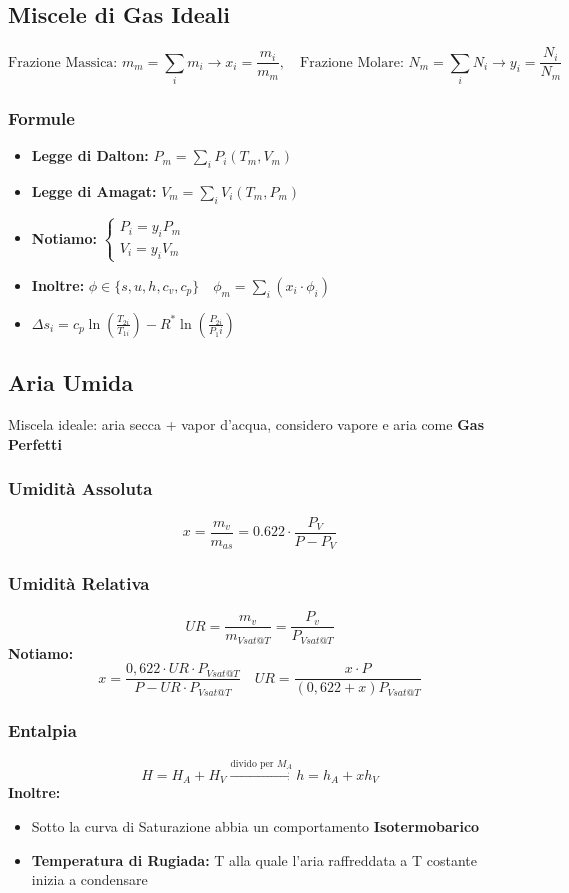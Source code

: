 \documentclass[a4paper]{report}
\begin{document}
\subsection*{Miscele di Gas Ideali}
\[
    \text{Frazione Massica: }\boxed{m_m = \sum_i m_i} \rightarrow \boxed{x_i = \frac{m_i}{m_m}}, \quad \text{Frazione Molare: }\boxed{N_m=\sum_i N_i}\rightarrow\boxed{y_i = \frac{N_i}{N_m}}
\]
\subsubsection*{Formule}
\begin{itemize}
    \item \textbf{Legge di Dalton:} $P_m = \sum_i P_i(T_m, V_m)$
    \item \textbf{Legge di Amagat:} $V_m = \sum_i V_i(T_m, P_m)$
    \item \textbf{Notiamo:} $\left\{\begin{array}{l}
    P_i = y_iP_m \\
    V_i = y_iV_m
    \end{array}\right.$
    \item \textbf{Inoltre:} $\phi \in \{s,u,h,c_v,c_p\} \quad \phi_m = \sum_i (x_i\cdot\phi_i )$
    \item $\boxed{\Delta s_i = c_p\ln\left(\frac{T_{2i}}{T_{1i}}\right)-R^*\ln\left(\frac{P_{2i}}{P_1i}\right)}$
\end{itemize}


\subsection*{Aria Umida}
Miscela ideale: aria secca + vapor d'acqua, considero vapore e aria come \textbf{Gas Perfetti}
\subsubsection*{Umidità Assoluta}
\[
   \boxed{x = \frac{m_v}{m_{as}} = 0.622 \cdot \frac{P_V}{P-P_V}}
\]
\subsubsection*{Umidità Relativa}
\[
   \boxed{UR = \frac{m_v}{m_{Vsat@T}} = \frac{P_v}{P_{Vsat@T}}}
\]
\textbf{Notiamo:}
\[
    \boxed{x = \frac{0,622 \cdot UR \cdot P_{Vsat@T}}{P-UR\cdot P_{Vsat@T}} } \quad \boxed{UR=\frac{x\cdot P}{(0,622+x)P_{Vsat@T}} }
\]
\subsubsection{Entalpia}
\[
    \boxed{H=H_A+H_V}\xrightarrow{\text{divido per } M_A}\boxed{h=h_A+xh_V}
\]
\textbf{Inoltre:}
\begin{itemize}
    \item Sotto la curva di Saturazione abbia un comportamento \textbf{Isotermobarico}
    \item \textbf{Temperatura di Rugiada:} T alla quale l'aria raffreddata a T costante inizia a condensare
\end{itemize}
\end{document}
